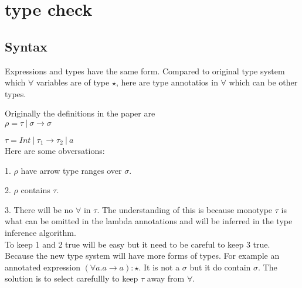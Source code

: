\newcommand{\tpmapsto}[3]{#2\mapsto#3}
\newcommand{\castupe}{\ensuremath{\mathsf{cast}^{\uparrow}\ }}
\newcommand{\castdowne}{\ensuremath{\mathsf{cast}^{\downarrow}\ }}
\newcommand{\judge}{\Gamma\vdash}
\newcommand{\forallvars}[1]{\forall \overbar{#1}}
\newcommand{\olpolymorphic}[2]{\vdash^{ol} #1 \sqsubseteq #2}

\gram{\otte\ottinterrule}

\gram{\ottR\ottinterrule}

\gram{\ottt\ottinterrule}


\iffalse
\section{type check}

\subsection{Syntax}

Expressions and types have the same form. Compared to original type system which $\forall$ variables are of type $\star$, here are type annotatios in $\forall$ which can be other types. \\

\gram{\otte\ottinterrule}

Originally the definitions in the paper are\\

$\rho = \tau\ |\ \sigma \to \sigma$

$\tau = Int\ |\ \tau_1 \to \tau_2\ |\ a$
\\[2.0mm]

Here are some obversations:

1. $\rho$ have arrow type ranges over $\sigma$.

2. $\rho$ contains $\tau$.

3. There will be no $\forall$ in $\tau$. The understanding of this is because monotype $\tau$ is what can be omitted in the lambda annotations and will be inferred in the type inference algorithm.\\

To keep 1 and 2 true will be easy but it need to be careful to keep 3 true. Because the new type system will have more forms of types. For example an annotated expression $(\forall a. a \to a):\star$. It is not a $\sigma$ but it do contain $\sigma$. The solution is to select carefullly to keep $\tau$ away from $\forall$. \\

\gram{\ottR\ottinterrule}

